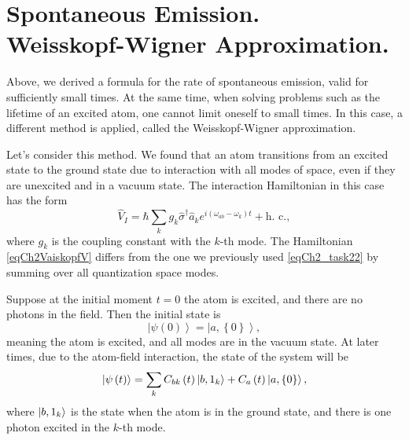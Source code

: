 \section{Spontaneous Emission. \\
  Weisskopf-Wigner Approximation.}

Above, we derived a formula for the rate of spontaneous emission, valid for sufficiently small times. At the same time, when solving problems such as the lifetime of an excited atom, one cannot limit oneself to small times. In this case, a different method is applied, called the Weisskopf-Wigner approximation.

Let's consider this method. We found that an atom transitions from an excited state to the ground state due to interaction with all modes of space, even if they are unexcited and in a vacuum state. The interaction Hamiltonian in this case has the form
\begin{equation}
\hat{V}_I = \hbar \sum_{k} g_k \hat{\sigma}^{\dag}\hat{a}_k e^{i\left(
\omega_{ab} - \omega_k
\right)t} + \text{h. c.},
\label{eqCh2VaiskopfV}
\end{equation}
where $g_k$ is the coupling constant with the $k$-th mode. The Hamiltonian \eqref{eqCh2VaiskopfV} differs from the one we previously used \eqref{eqCh2_task22} by summing over all quantization space modes.

Suppose at the initial moment $t=0$ the atom is excited, and there are no photons in the field. Then the initial state is
\begin{equation}
\left|\psi\left(0\right)\right> =
 \left|a, \left\{0\right\}\right>,
\nonumber
\end{equation}
meaning the atom is excited, and all modes are in the vacuum state. At later times, due to the atom-field interaction, the state of the system will be
\begin{equation}
\left|\psi\left(t\right)\right> =
\sum_{k} C_{bk}\left(t\right) \ket{b, 1_k}
+
C_{a}\left(t\right) \left|a, \left\{0\right\}\right>,
\label{eqCh2Vaiskopf3}
\end{equation}
where $\ket{b, 1_k}$ is the state when the atom is in the ground state, and there is one photon excited in the $k$-th mode.

